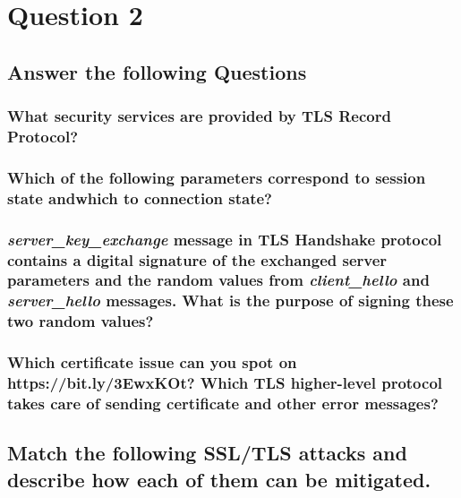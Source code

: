 \documentclass{report}
\begin{document}
	\section{Question 2}
	\startsection
		\renewcommand{\thesubsection}{\thesection.\Alph{subsection}}
		\subsection{Answer the following Questions}
		\startsubsection
			\subsubsection{What security services are provided by TLS Record Protocol?}
			\startsubsection
			\closesection
			\subsubsection{Which of the following parameters correspond to session state andwhich to connection state?}
			\startsubsection
			\closesection
			\subsubsection{\textit{server\_key\_exchange} message in TLS Handshake protocol contains a digital signature of the exchanged server parameters and the random values from \textit{client\_hello} and \textit{server\_hello} messages. What is the purpose of signing these two random values?}
			\startsubsection
			\closesection
			\subsubsection{Which certificate issue can you spot on https://bit.ly/3EwxKOt? Which TLS higher-level protocol takes care of sending certificate and other error messages?}
			\startsubsection
			\closesection
		\closesection
		
		\subsection{Match the following SSL/TLS attacks and describe how each of them can be mitigated.}
		\startsubsection
		\closesection
	\closesection
\end{document}
